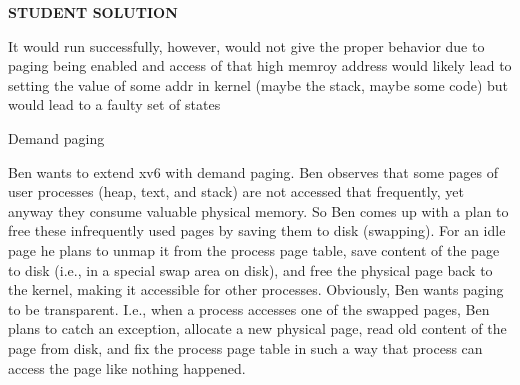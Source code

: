 \documentclass[11pt]{exam}
\begin{document}
\begin{questions}
\begin{parts}
\textbf{STUDENT SOLUTION } 
\begin{adjustwidth}{1.5em}{1em}
It would run successfully, however, would not give the proper behavior due to paging being enabled and access of that high memroy address would 
likely lead to setting the value of some addr in kernel (maybe the stack, maybe some code) but would lead to a faulty set of states
\end{adjustwidth}
  \vfill

\end{parts}

\newpage
\addpoints
\question Demand paging 

Ben wants to extend xv6 with demand paging. Ben observes that some pages of
user processes (heap, text, and stack) are not accessed
that frequently, yet anyway they consume valuable physical memory. So Ben comes
up with a plan to free these infrequently used pages by saving them to disk (swapping). For an idle page he plans to unmap
it from the process page table, save content of the page to disk (i.e., in a special swap area on disk), and free the physical page back to the 
kernel, making it accessible for other processes. Obviously,
Ben wants paging to be transparent. I.e., when a process accesses one of the
swapped pages, Ben plans to catch an exception, allocate a new physical page,
read old content of the page from disk, and fix the process page table in such a
way that process can access the page like nothing happened. 



\end{questions}
\end{document}
